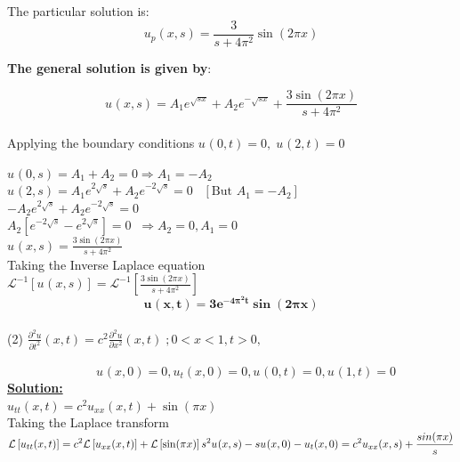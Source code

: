 \documentclass[12pt]{report}
\newcommand{\Laplace}{\mathcal{L}}
\newcommand{\sbracket}[1]{\left[#1\right]}
\newcommand{\Un}[2]{u_{#1}(#2)}
\newcommand{\NI}{\noindent}
\newcommand{\psq}{\pi^{2}}
\newcommand{\InverseL}[1]{\Laplace^{-1}\left[#1\right]}
\newcommand{\LT}[1]{\Laplace \left[#1\right]}
\begin{document}
\NI The particular solution is:\\
$$\Un{p}{x,s} = \frac{3}{s + 4\pi^{2}}\sin(2\pi x) $$

\NI  \textbf{The general solution is given by}:

$$\Un{}{x,s} = A_{1}e^{\sqrt{sx}} + A_{2}e^{-\sqrt{sx}} + \frac{3\sin(2\pi x)}{s + 4\pi^{2}}$$ \\[0.5cm]

\NI Applying the boundary conditions $\Un{}{0,t} = 0, \; \Un{}{2,t} = 0$

\NI $\displaystyle \Un{}{0,s} = A_1 + A_2 = 0 \Rightarrow A_1 = - A_2$\\[0.2cm]
\NI $\displaystyle \Un{}{2,s} = A_{1}e^{2\sqrt{s}} + A_{2}e^{-2\sqrt{s}} = 0 \; \; \; \sbracket{\text{But } A_1 = - A_2}$\\[0.2cm]
$\displaystyle - A_2e^{2\sqrt{s}} + A_2e^{-2\sqrt{s}} = 0$\\[0.2cm]
$\displaystyle A_{2}\sbracket{e^{-2\sqrt{s}} - e^{2\sqrt{s}}} = 0 \; \; \Rightarrow A_2 = 0, A_1 = 0$\\[0.2cm]

\NI ${\displaystyle \Un{}{x,s} = \frac{3\sin(2\pi x)}{s + 4\pi^{2}}}$\\[0.5cm]

\NI Taking the Inverse Laplace equation\\[0.2cm]
$\displaystyle
\InverseL{\Un{}{x,s}} = \InverseL{\frac{3\sin(2\pi x)}{s + 4\psq}}
$\\[0.3cm]

$$ \mathbf{
\Un{}{x,t} = 3e^{-4\psq t}\sin(2\pi x)}
$$\\[1.0cm]

\NI (2) $\displaystyle \frac{\partial^2 u}{\partial t^2}(x,t) = c^2 \frac{\partial^2 u}{\partial x^2}(x,t) \; ; 0<x<1, t > 0, $

$\hspace{3cm} \displaystyle \Un{}{x,0} = 0, \Un{t}{x,0} = 0,  \Un{}{0,t} = 0,  \Un{}{1,t} = 0$\\

\NI \underline{\textbf{Solution:}} \\[0.2cm]
$\displaystyle \Un{tt}{x,t} = c^2 \Un{xx}{x,t} + \sin(\pi x) $\\[0.2cm]

\NI Taking the Laplace transform \\[0.2cm]
$\displaystyle
\LT{\Un{tt}{x,t}} = c^2 \LT{\Un{xx}{x,t}} + \LT{\sin(\pi x)} \\[0.1cm]
s^2 \Un{}{x,s} - s\Un{}{x,0} - \Un{t}{x,0} = c^2 \Un{xx}{x,s} + \frac{sin(\pi x)}{s}
$\\[0.2cm]
\end{document}
